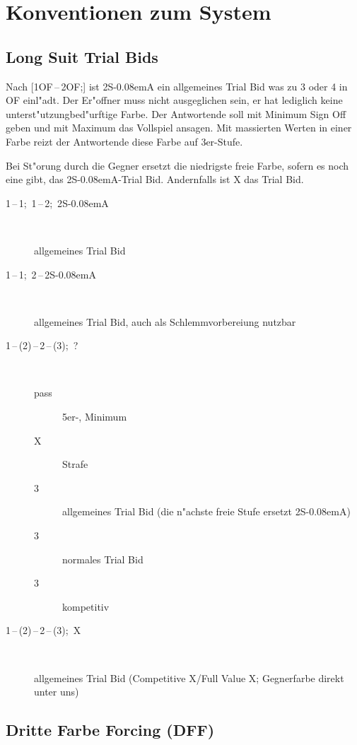 \documentclass[11pt,german,twocolumn,twoside]{scrartcl}
\def\pi{\Sp\xspace}
\def\sa{\nobreak\textsf{S\kern-0.08emA}\xspace}
\def\ofa{\nobreak\textsf{OF}\xspace}
\def\pik{\nobreak\hspace{\cardskip}\Sp\xspace}
\def\coe{\nobreak\hspace{\cardskip}\He\xspace}
\def\kar{\nobreak\hspace{\cardskip}\Di\xspace}
\def\tre{\nobreak\hspace{\cardskip}\Cl\xspace}
\def\SA{\nobreak\hspace{\cardskip}\sa}
\def\of{\nobreak\hspace{\cardskip}\textsf{OF}\xspace}
\def\kontra{\textsf{X}\xspace}
\def\sep{\,--\,}
\begin{document}
\newpage
\section{Konventionen zum System}

\subsection{Long Suit Trial Bids}

Nach [1\of{}\sep2\of;] ist 2\SA ein allgemeines Trial Bid was zu 3 oder 4 in
\ofa einl"adt. Der Er"offner muss nicht ausgeglichen sein, er hat lediglich keine
unterst"utzungbed"urftige Farbe. Der Antwortende soll mit Minimum Sign Off geben und mit
Maximum das Vollspiel ansagen. Mit massierten Werten in einer Farbe reizt der
Antwortende diese Farbe auf 3er-Stufe.

Bei St"orung durch die Gegner ersetzt die niedrigste freie Farbe, sofern es
noch eine gibt, das 2\SA-Trial Bid. Andernfalls ist \kontra das Trial Bid.

\begin{description}
\item[1\tre{}\sep1\coe;~1\pik{}\sep2\pik;~2\SA]~

  allgemeines Trial Bid
\item[1\tre{}\sep1\pik;~2\pik{}\sep2\SA]~

  allgemeines Trial Bid, auch als Schlemmvorbereiung nutzbar
\item[1\pik{}\sep(2\tre)\sep2\pik{}\sep(3\tre);~?]~
  \begin{description}
    \item[pass] 5er-\pi, Minimum
    \item[\kontra] Strafe
    \item[3\kar] allgemeines Trial Bid (die n"achste freie Stufe
      ersetzt 2\SA)
    \item[3\coe] normales Trial Bid
    \item[3\pik] kompetitiv
  \end{description}
\item[1\pik{}\sep(2\coe)\sep2\pik{}\sep(3\coe);~\kontra]~

  allgemeines Trial Bid (Competitive \kontra/Full Value \kontra;
  Gegnerfarbe direkt unter uns)
\end{description}

\subsection{Dritte Farbe Forcing (DFF)} \label{dff}
\end{document}
